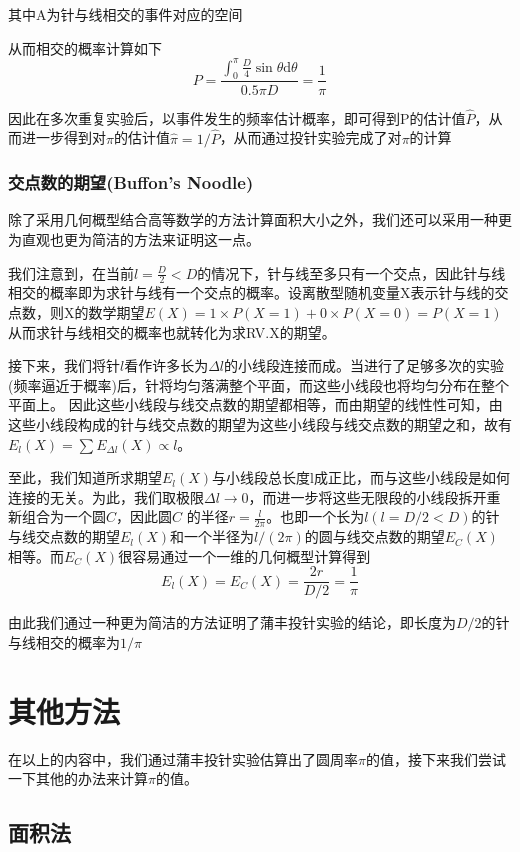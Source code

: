 \documentclass[UTF8]{ctexart}
\begin{document}
        其中A为针与线相交的事件对应的空间\par
        从而相交的概率计算如下\[ P=\frac{\int_{0}^{\pi}\frac{D}{4}\sin \theta \mathrm{d}\theta}{0.5\pi D}=\frac{1}{\pi} \]

        因此在多次重复实验后，以事件发生的频率估计概率，即可得到P的估计值$\hat{P}$，从而进一步得到对$\pi$的估计值$\hat{\pi}=1/\hat{P}$，从而通过投针实验完成了对$\pi$的计算

    \subsubsection{交点数的期望(Buffon's Noodle)}
        除了采用几何概型结合高等数学的方法计算面积大小之外，我们还可以采用一种更为直观也更为简洁的方法来证明这一点。\par
        我们注意到，在当前$l=\frac{D}{2}<D$的情况下，针与线至多只有一个交点，因此针与线相交的概率即为求针与线有一个交点的概率。设离散型随机变量X表示针与线的交点数，则X的数学期望$E(X)=1\times P(X=1)+0\times P(X=0)=P(X=1)$
    从而求针与线相交的概率也就转化为求RV.X的期望。\par
        接下来，我们将针$l$看作许多长为$\Delta l$的小线段连接而成。当进行了足够多次的实验(频率逼近于概率)后，针将均匀落满整个平面，而这些小线段也将均匀分布在整个平面上。
    因此这些小线段与线交点数的期望都相等，而由期望的线性性可知，由这些小线段构成的针与线交点数的期望为这些小线段与线交点数的期望之和，故有$E_l(X)=\sum E_{\Delta l}(X)\propto l$。\par
        至此，我们知道所求期望$E_l(X)$与小线段总长度l成正比，而与这些小线段是如何连接的无关。为此，我们取极限$\Delta l\to 0$，而进一步将这些无限段的小线段拆开重新组合为一个圆$C$，因此圆$C$
    的半径$r=\frac{l}{2\pi}$。也即一个长为$l(l=D/2<D)$的针与线交点数的期望$E_l(X)$和一个半径为$l/(2\pi)$的圆与线交点数的期望$E_C(X)$相等。而$E_C(X)$很容易通过一个一维的几何概型计算得到
        \[ E_l(X)=E_C(X)=\frac{2r}{D/2}=\frac{1}{\pi} \]

        由此我们通过一种更为简洁的方法证明了蒲丰投针实验的结论，即长度为$D/2$的针与线相交的概率为$1/\pi$


    \section{其他方法}
        在以上的内容中，我们通过蒲丰投针实验估算出了圆周率$\pi$的值，接下来我们尝试一下其他的办法来计算$\pi$的值。
    \subsection{面积法}
\end{document}
